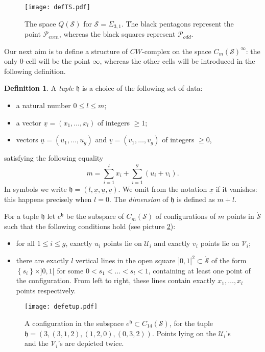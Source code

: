 \documentclass{amsart}
\theoremstyle{plain}
\theoremstyle{definition}
\newtheorem{defn}[thm]  {Definition}
\newcommand{\cP}{\mathcal{P}}
\renewcommand{\S}{\mathcal{S}}
\newcommand{\U}{\mathcal{U}}
\newcommand{\V}{\mathcal{V}}
\newcommand{\cms}{C_m(\S)}
\newcommand{\tup}{\mathfrak{h}}
\newcommand{\set}[1]{\left\{#1\right\}}
\newcommand{\mrS}{\mathring{\S}}
\newcommand{\ux}{\underline{x}}
\newcommand{\uu}{\underline{u}}
\newcommand{\uv}{\underline{v}}
\begin{document}
\begin{figure}[ht]\centering
 \texttt{[image: defTS.pdf]}
 \caption{The space $Q(\S)$ for $\S=\Sigma_{3,1}$. The black pentagons represent the point $\cP_{even}$, whereas the black
 squares represent $\cP_{odd}$.}
\label{fig:defTS}
\end{figure}


Our next aim is to define a structure of $CW$-complex on the space $\cms^{\infty}$:
the only $0$-cell will be the point $\infty$, whereas the other cells will be introduced
in the following definition.
\begin{defn}
\label{defn:ehopen}
A \emph{tuple} $\tup$ is a choice of the following set of data:
 \begin{itemize}
  \item a natural number $0\leq l\leq m$;
  \item a vector $\ux=(x_1,\dots, x_l)$ of integers $\geq 1$;
  \item vectors $\uu=(u_1,\dots,u_g)$ and $\uv=(v_1,\dots,v_g)$ of integers $\geq 0$,
 \end{itemize}
satisfying the following equality
\[
 m=\sum_{i=1}^lx_i+\sum_{i=1}^g(u_i+v_i).
\]
In symbols we write $\tup=(l,\ux,\uu,\uv)$. We omit from the notation $\ux$ if it vanishes: this happens precisely when $l=0$.
The \emph{dimension} of $\tup$ is defined as $m+l$.

For a tuple $\tup$ let $e^{\tup}$ be the subspace
of $\cms$ of configurations of $m$ points in $\mrS$ such that the following conditions hold
(see picture \ref{fig:defetup}):
\begin{itemize}
 \item for all $1\leq i\leq g$, exactly $u_i$ points lie on $\U_i$
 and exactly $v_i$ points lie on $\V_i$;
 \item there are exactly $l$ vertical lines in the open square $]0,1[^2\subset\mrS$ of the
 form $\set{s_i}\times]0,1[$ for some $0<s_1<\dots<s_l<1$, containing at least one
 point of the configuration. From left to right, these lines contain exactly $x_1,\dots,x_l$ points
 respectively.
\end{itemize}
\end{defn}


\begin{figure}[ht]\centering
 \texttt{[image: defetup.pdf]}
 \caption{A configuration in the subspace $e^{\tup}\subset C_{14}(\S)$, for the tuple $\tup=(3,(3,1,2),(1,2,0),(0,3,2))$. Points
 lying on the $\U_i$'s and the $\V_i$'s are depicted twice.}
\label{fig:defetup}
\end{figure}
\end{document}
